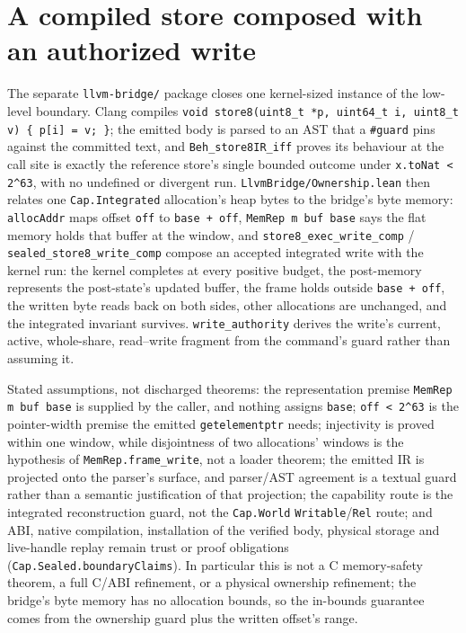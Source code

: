 \documentclass[10pt,a4paper]{article}
\newcommand{\file}[1]{\texttt{\small #1}}
\begin{document}
\section{A compiled store composed with an authorized write}\label{sec:kernel}

The separate \file{llvm-bridge/} package closes one kernel-sized instance of the
low-level boundary. Clang compiles
\texttt{void store8(uint8\_t *p, uint64\_t i, uint8\_t v) \{ p[i] = v; \}}; the
emitted body is parsed to an AST that a \texttt{\#guard} pins against the
committed text, and \texttt{Beh\_store8IR\_iff} proves its behaviour at the call
site is exactly the reference store's single bounded outcome under
\texttt{x.toNat < 2\textasciicircum 63}, with no undefined or divergent run.
\file{LlvmBridge/Ownership.lean} then relates one
\texttt{Cap.Integrated} allocation's heap bytes to the bridge's byte memory:
\texttt{allocAddr} maps offset \texttt{off} to \texttt{base + off},
\texttt{MemRep m buf base} says the flat memory holds that buffer at the window,
and \texttt{store8\_exec\_write\_comp} / \texttt{sealed\_store8\_write\_comp}
compose an accepted integrated write with the kernel run: the kernel completes
at every positive budget, the post-memory represents the post-state's updated
buffer, the frame holds outside \texttt{base + off}, the written byte reads back
on both sides, other allocations are unchanged, and the integrated invariant
survives. \texttt{write\_authority} derives the write's current, active,
whole-share, read--write fragment from the command's guard rather than assuming
it.

Stated assumptions, not discharged theorems: the representation premise
\texttt{MemRep m buf base} is supplied by the caller, and nothing assigns
\texttt{base}; \texttt{off < 2\textasciicircum 63} is the pointer-width premise
the emitted \texttt{getelementptr} needs; injectivity is proved within one
window, while disjointness of two allocations' windows is the hypothesis of
\texttt{MemRep.frame\_write}, not a loader theorem; the emitted IR is projected
onto the parser's surface, and parser/AST agreement is a textual guard rather
than a semantic justification of that projection; the capability route is the
integrated reconstruction guard, not the \texttt{Cap.World}
\texttt{Writable}/\texttt{Rel} route; and ABI, native compilation, installation
of the verified body, physical storage and live-handle replay remain trust or
proof obligations (\texttt{Cap.Sealed.boundaryClaims}). In particular this is not
a C memory-safety theorem, a full C/ABI refinement, or a physical ownership
refinement; the bridge's byte memory has no allocation bounds, so the in-bounds
guarantee comes from the ownership guard plus the written offset's range.
\end{document}

